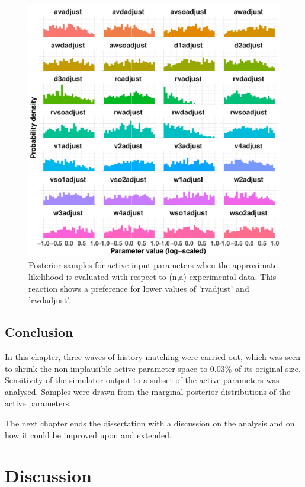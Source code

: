 \documentclass[
  12pt,
  a4paper,
  twoside]{book}
\begin{document}
\begin{figure}[H]

{\centering \includegraphics[width=0.8\linewidth]{figures/na_posterior} 

}

\caption{Posterior samples for active input parameters when the approximate likelihood is evaluated with respect to (n,a) experimental data. This reaction shows a preference for lower values of 'rvadjust' and 'rwdadjust'.}\label{fig:na-posterior}
\end{figure}

\hypertarget{conclusion-3}{%
\section{Conclusion}\label{conclusion-3}}

In this chapter, three waves of history matching were carried out, which was seen to shrink the non-implausible active parameter space to 0.03\% of its original size. Sensitivity of the simulator output to a subset of the active parameters was analysed. Samples were drawn from the marginal posterior distributions of the active parameters.

The next chapter ends the dissertation with a discussion on the analysis and on how it could be improved upon and extended.

\hypertarget{Discussion}{%
\chapter{Discussion}\label{Discussion}}
\end{document}
